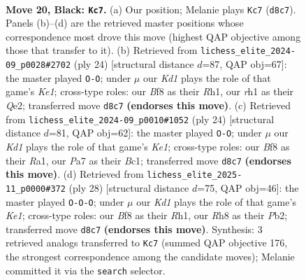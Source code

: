 \documentclass[11pt]{article}
\begin{document}
\clearpage

\begin{figure}[p]\centering
\begin{subfigure}{0.46\textwidth}\centering
\resizebox{\linewidth}{!}{%
\newchessgame
\chessboard[
  setfen={r2k1b1r/pp4pp/2p1b3/q2p1p2/P2P4/1Q2PN1P/1PK2PP1/1RB4R b - - 4 20},
  showmover=false,
  pgfstyle=straightmove, color=movearrow, markmove={d8-c7}
]}
\caption{}
\end{subfigure}\hfill
\begin{subfigure}{0.46\textwidth}\centering
\resizebox{\linewidth}{!}{%
\newchessgame
\chessboard[
  setfen={r3k2r/pp3pbp/1q2p1pn/3pP3/3P1P2/2N1B3/PP2Q1PP/R3K2R w KQkq - 2 13},
  showmover=false,
  pgfstyle=straightmove, color=movearrow, markmove={e1-g1}
]}
\caption{}
\end{subfigure}
\\[4pt]
\begin{subfigure}{0.46\textwidth}\centering
\resizebox{\linewidth}{!}{%
\newchessgame
\chessboard[
  setfen={r1b2rk1/pppn1pp1/7p/3p2q1/3P4/2PBP3/P1Q2PP1/R1B1K2R w KQ - 0 13},
  showmover=false,
  pgfstyle=straightmove, color=movearrow, markmove={e1-g1}
]}
\caption{}
\end{subfigure}\hfill
\begin{subfigure}{0.46\textwidth}\centering
\resizebox{\linewidth}{!}{%
\newchessgame
\chessboard[
  setfen={r4rk1/p1ppq1pp/1pn1pb2/7P/2PP4/2NQB3/PP3PP1/R3K2R w KQ - 2 15},
  showmover=false,
  pgfstyle=straightmove, color=movearrow, markmove={e1-c1}
]}
\caption{}
\end{subfigure}
\caption{\textbf{Move 20, Black: \texttt{Kc7}.} (a) Our position; Melanie plays \texttt{Kc7} (\texttt{d8c7}). Panels (b)--(d) are the retrieved master positions whose correspondence most drove this move (highest QAP objective among those that transfer to it). (b) Retrieved from \texttt{lichess\_elite\_2024-09\_p0028\#2702} (ply 24) [structural distance $d$=87, QAP obj=67]: the master played \texttt{O-O}; under $\mu$ our \emph{Kd1} plays the role of that game's \emph{Ke1}; cross-type roles: our \emph{B}f8 as their \emph{R}h1, our \emph{r}h1 as their \emph{Q}e2; transferred move \texttt{d8c7} \textbf{(endorses this move)}. (c) Retrieved from \texttt{lichess\_elite\_2024-09\_p0010\#1052} (ply 24) [structural distance $d$=81, QAP obj=62]: the master played \texttt{O-O}; under $\mu$ our \emph{Kd1} plays the role of that game's \emph{Ke1}; cross-type roles: our \emph{B}f8 as their \emph{R}a1, our \emph{P}a7 as their \emph{B}c1; transferred move \texttt{d8c7} \textbf{(endorses this move)}. (d) Retrieved from \texttt{lichess\_elite\_2025-11\_p0000\#372} (ply 28) [structural distance $d$=75, QAP obj=46]: the master played \texttt{O-O-O}; under $\mu$ our \emph{Kd1} plays the role of that game's \emph{Ke1}; cross-type roles: our \emph{B}f8 as their \emph{R}h1, our \emph{R}h8 as their \emph{P}b2; transferred move \texttt{d8c7} \textbf{(endorses this move)}. Synthesis: 3 retrieved analogs transferred to \texttt{Kc7} (summed QAP objective 176, the strongest correspondence among the candidate moves); Melanie committed it via the \texttt{search} selector.}
\label{fig:thought-m39}
\end{figure}
\end{document}
